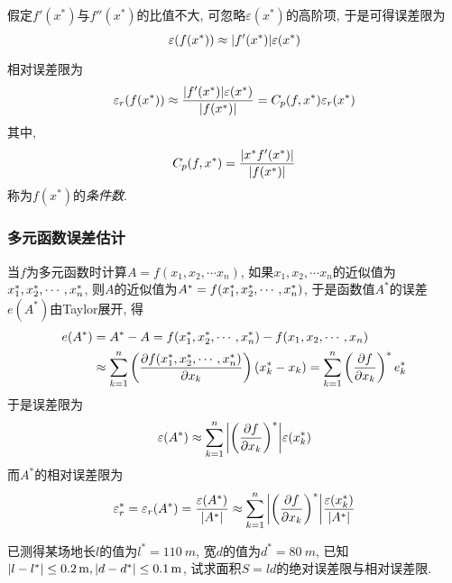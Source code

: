 假定$f'(x^*)$与$f''(x^*)$的比值不大, 可忽略$\varepsilon(x^*)$的高阶项, 于是可得误差限为
\begin{equation*}
    \varepsilon(f(x^*))\approx\abs{f'(x^*)}\varepsilon(x^*)
\end{equation*}

相对误差限为
\begin{equation*}
    \varepsilon_r(f(x^*))\approx\frac{\abs{f'(x^*)}\varepsilon(x^*)}{\abs{f(x^*)}}=C_p(f,x^*)\varepsilon_r(x^*)
\end{equation*}
其中,
\begin{equation*}
    C_p(f,x^*)=\frac{\abs{x^*f'(x^*)}}{\abs{f(x^*)}}
\end{equation*}
称为$f(x^*)$的\emph{条件数}.

\subsubsection{多元函数误差估计}

当$f$为多元函数时计算$A=f(x_1,x_2,\cdots x_n)$, 如果$x_1,x_2,\cdots x_n$的近似值为$x_1^*,x_2^*,\cdots, x_n^*$, 
则$A$的近似值为$A^*=f(x_1^*,x_2^*,\cdots,x_n^*)$, 于是函数值$A^*$的误差$e(A^*)$由Taylor展开, 得
\begin{align*}
    e(A^*)&=A^*-A=f(x_1^*,x_2^*,\cdots,x_n^*)-f(x_1,x_2,\cdots,x_n)\\
    &\approx\sum_{k=1}^n\left(\pdv{f(x_1^*,x_2^*,\cdots,x_n^*)}{x_k}\right)(x_k^*-x_k)=\sum_{k=1}^n\left(\pdv{f}{x_k}\right)^*e_k^*
\end{align*}
于是误差限为
\begin{equation}\label{eqn:1.3.3}
    \varepsilon(A^*)\approx\sum_{k=1}^n\abs{\left(\pdv{f}{x_k}\right)^*}\varepsilon(x_k^*)
\end{equation}
而$A^*$的相对误差限为
\begin{equation*}
    \varepsilon_r^*=\varepsilon_r(A^*)=\frac{\varepsilon(A^*)}{\abs{A^*}}\approx\sum_{k=1}^n\abs{\left(\pdv{f}{x_k}\right)^*}\frac{\varepsilon(x_k^*)}{\abs{A^*}}
\end{equation*}

\begin{example}
    已测得某场地长$l$的值为$l^*=\SI{110}{m}$, 宽$d$的值为$d^*=\SI{80}{m}$, 已知$\abs{l-l^*}\le\SI{0.2}{m},\abs{d-d^*}\le\SI{0.1}{m}$, 
    试求面积$S=ld$的绝对误差限与相对误差限.
\end{example}

